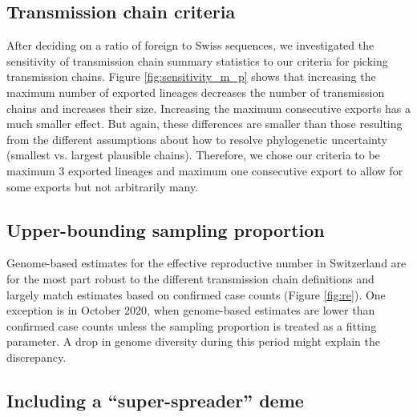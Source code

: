\documentclass[9pt,twoside,lineno]{pnas-new}
\begin{document}
\subsection{Transmission chain criteria}
After deciding on a ratio of foreign to Swiss sequences, we investigated the sensitivity of transmission chain summary statistics to our criteria for picking transmission chains. Figure \ref{fig:sensitivity_m_p} shows that increasing the maximum number of exported lineages decreases the number of transmission chains and increases their size. Increasing the maximum consecutive exports has a much smaller effect. But again, these differences are smaller than those resulting from the different assumptions about how to resolve phylogenetic uncertainty (smallest vs. largest plausible chains). Therefore, we chose our criteria to be maximum 3 exported lineages and maximum one consecutive export to allow for some exports but not arbitrarily many. 

\subsection{Upper-bounding sampling proportion}
Genome-based estimates for the effective reproductive number in Switzerland are for the most part robust to the different transmission chain definitions and largely match estimates based on confirmed case counts (Figure \ref{fig:re}). One exception is in October 2020, when genome-based estimates are lower than confirmed case counts unless the sampling proportion is treated as a fitting parameter. A drop in genome diversity during this period might explain the discrepancy. 

\subsection{Including a ``super-spreader'' deme}


\end{document}
